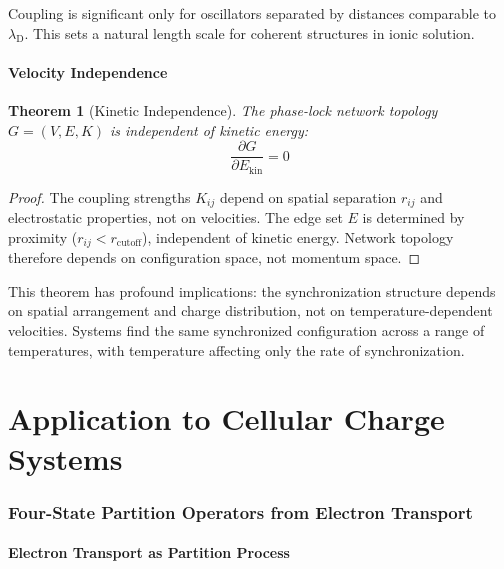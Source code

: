 \documentclass[twocolumn,aps,prb,superscriptaddress,longbibliography,floatfix]{revtex4-2}
\newtheorem{theorem}{Theorem}[section]
\theoremstyle{remark}
\newcommand{\lambdaD}{\lambda_\text{D}}
\begin{document}
Coupling is significant only for oscillators separated by distances
comparable to $\lambdaD$. This sets a natural length scale for coherent
structures in ionic solution.

\subsection{Velocity Independence}

\begin{theorem}[Kinetic Independence]
\label{thm:kinetic}
The phase-lock network topology $G = (V, E, K)$ is independent of
kinetic energy:
\begin{equation}
\frac{\partial G}{\partial E_\text{kin}} = 0
\label{eq:kinetic_indep}
\end{equation}
\end{theorem}

\begin{proof}
The coupling strengths $K_{ij}$ depend on spatial separation $r_{ij}$
and electrostatic properties, not on velocities. The edge set $E$ is
determined by proximity ($r_{ij} < r_\text{cutoff}$), independent of
kinetic energy. Network topology therefore depends on configuration
space, not momentum space.
\end{proof}

This theorem has profound implications: the synchronization structure
depends on spatial arrangement and charge distribution, not on
temperature-dependent velocities. Systems find the same synchronized
configuration across a range of temperatures, with temperature affecting
only the rate of synchronization.

\part{Application to Cellular Charge Systems}

\section{Four-State Partition Operators from Electron Transport}
\label{sec:fourstate}

\subsection{Electron Transport as Partition Process}
\end{document}

